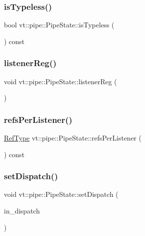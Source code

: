 \subsubsection{\texorpdfstring{is\+Typeless()}{isTypeless()}}
{\footnotesize\ttfamily bool vt\+::pipe\+::\+Pipe\+State\+::is\+Typeless (\begin{DoxyParamCaption}{ }\end{DoxyParamCaption}) const}

\mbox{\label{structvt_1_1pipe_1_1_pipe_state_acfbe1dc3cac73153543a394b4f8add35}} 
\subsubsection{\texorpdfstring{listener\+Reg()}{listenerReg()}}
{\footnotesize\ttfamily void vt\+::pipe\+::\+Pipe\+State\+::listener\+Reg (\begin{DoxyParamCaption}{ }\end{DoxyParamCaption})}

\mbox{\label{structvt_1_1pipe_1_1_pipe_state_a4e0c0ff9eebf70c05e283474fdbdeb14}} 
\subsubsection{\texorpdfstring{refs\+Per\+Listener()}{refsPerListener()}}
{\footnotesize\ttfamily \hyperlink{namespacevt_a9b39ce9494bb04674d0d5b895a5aa50f}{Ref\+Type} vt\+::pipe\+::\+Pipe\+State\+::refs\+Per\+Listener (\begin{DoxyParamCaption}{ }\end{DoxyParamCaption}) const}

\mbox{\label{structvt_1_1pipe_1_1_pipe_state_a436083ce72366f0bece034065bb3aca1}} 
\subsubsection{\texorpdfstring{set\+Dispatch()}{setDispatch()}}
{\footnotesize\ttfamily void vt\+::pipe\+::\+Pipe\+State\+::set\+Dispatch (\begin{DoxyParamCaption}\item[{\hyperlink{structvt_1_1pipe_1_1_pipe_state_ad81b637847d9c3185420c58c9272ed7d}{Dispatch\+Func\+Type}}]{in\+\_\+dispatch }\end{DoxyParamCaption})}

